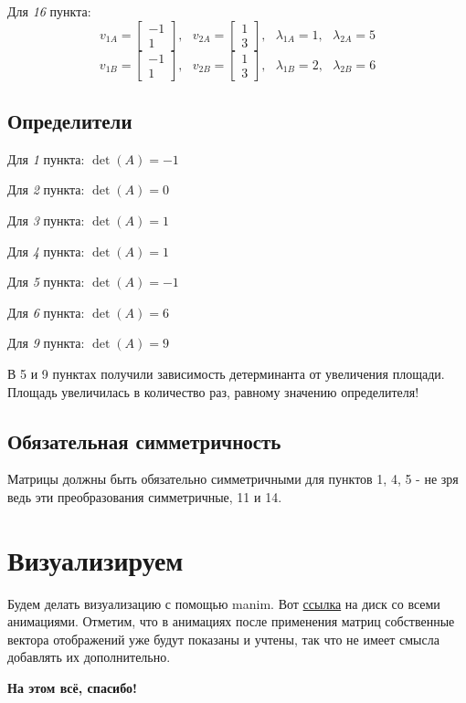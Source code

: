 \documentclass[a4paper,hidelinks,14pt]{extarticle}
\begin{document}
	Для \textit{16} пункта:
	$$
	v_{1A}=\begin{bmatrix}
		-1 \\ 1
	\end{bmatrix}, \text{ }
	v_{2A} = \begin{bmatrix}
		1 \\ 3
	\end{bmatrix}, \text{ }
	\lambda_{1A} = 1, \text{ }
	\lambda_{2A} = 5
	$$
	$$
	v_{1B}=\begin{bmatrix}
		-1 \\ 1
	\end{bmatrix}, \text{ }
	v_{2B} = \begin{bmatrix}
		1 \\ 3
	\end{bmatrix}, \text{ }
	\lambda_{1B} = 2, \text{ }
	\lambda_{2B} = 6
	$$
	\subsection{Определители}
	Для \textit{1} пункта: $\det(A) = -1$
	
	\vspace{1mm}
	
	Для \textit{2} пункта: $\det(A) = 0$
	
	\vspace{1mm}
	
	Для \textit{3} пункта: $\det(A) = 1$
	
	\vspace{1mm}
	
	Для \textit{4} пункта: $\det(A) = 1$
	
	\vspace{1mm}
	
	Для \textit{5} пункта: $\det(A) = -1$
	
	\vspace{1mm}
	
	Для \textit{6} пункта: $\det(A) = 6$
	
	\vspace{1mm}
	
	Для \textit{9} пункта: $\det(A) = 9$
	
	В 5 и 9 пунктах получили зависимость детерминанта от увеличения площади. Площадь увеличилась в количество раз, равному значению определителя!
	
	\subsection{Обязательная симметричность}
	Матрицы должны быть обязательно симметричными для пунктов 1, 4, 5 - не зря ведь эти преобразования симметричные, 11 и 14.
	
	\section{Визуализируем}
	Будем делать визуализацию с помощью manim. Вот \href{https://drive.google.com/drive/folders/1UD4GCDIHPwfSrOiIkLXwKyiMfg2L4nb8?usp=sharing}{ссылка} на диск со всеми анимациями. Отметим, что в анимациях после применения матриц собственные вектора отображений уже будут показаны и учтены, так что не имеет смысла добавлять их дополнительно.
	
	\textbf{На этом всё, спасибо!}
\end{document}
